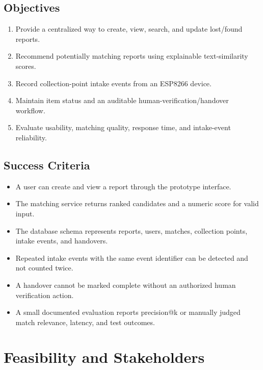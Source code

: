 \documentclass[12pt,a4paper]{report}
\begin{document}
\section{Objectives}
\begin{enumerate}[label=\arabic*.]
\item Provide a centralized way to create, view, search, and update lost/found reports.
\item Recommend potentially matching reports using explainable text-similarity scores.
\item Record collection-point intake events from an ESP8266 device.
\item Maintain item status and an auditable human-verification/handover workflow.
\item Evaluate usability, matching quality, response time, and intake-event reliability.
\end{enumerate}

\section{Success Criteria}
\begin{itemize}
\item A user can create and view a report through the prototype interface.
\item The matching service returns ranked candidates and a numeric score for valid input.
\item The database schema represents reports, users, matches, collection points, intake events, and handovers.
\item Repeated intake events with the same event identifier can be detected and not counted twice.
\item A handover cannot be marked complete without an authorized human verification action.
\item A small documented evaluation reports precision@k or manually judged match relevance, latency, and test outcomes.
\end{itemize}

\chapter{Feasibility and Stakeholders}
\end{document}
